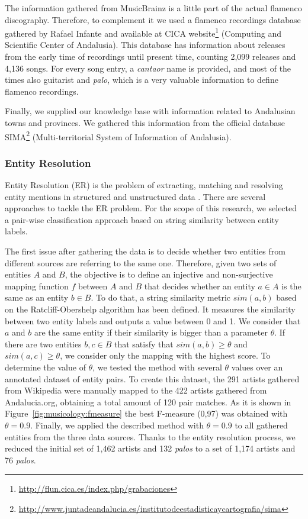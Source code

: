 The information gathered from MusicBrainz is a little part of the actual flamenco discography. Therefore, to complement it we used a flamenco recordings database gathered by Rafael Infante and available at CICA website\footnote{\url{http://flun.cica.es/index.php/grabaciones}} (Computing and Scientific Center of Andalusia). This database has information about releases from the early time of recordings until present time, counting 2,099 releases and 4,136 songs. For every song entry, a \textit{cantaor} name is provided, and most of the times also guitarist and \textit{palo}, which is a very valuable information to define flamenco recordings.

Finally, we supplied our knowledge base with information related to Andalusian towns and provinces. We gathered this information from the official database SIMA\footnote{\url{http://www.juntadeandalucia.es/institutodeestadisticaycartografia/sima}} (Multi-territorial System of Information of Andalusia).%


\subsubsection{Entity Resolution}\label{sec:musicology:entity_resolution}

Entity Resolution (ER) is the problem of extracting, matching and resolving entity mentions in structured and unstructured data \cite{Getoor2012}. There are several approaches to tackle the ER problem. For the scope of this research, we selected a pair-wise classification approach based on string similarity between entity labels.

The first issue after gathering the data is to decide whether two entities from different sources are referring to the same one. Therefore, given two sets of entities $A$ and $B$, the objective is to define an injective and non-surjective mapping function $f$ between $A$ and $B$ that decides whether an entity $a \in A$ is the same as an entity $b \in B$. To do that, a string similarity metric $sim(a,b)$ based on the Ratcliff-Obershelp algorithm \cite{Ratcliff1988} has been defined. It measures the similarity between two entity labels and outputs a value between 0 and 1. We consider that $a$ and $b$ are the same entity if their similarity is bigger than a parameter $\theta$. If there are two entities $b, c \in B$ that satisfy that $sim(a,b) \geq \theta$ and $sim(a,c) \geq \theta$, we consider only the mapping with the highest score. To determine the value of $\theta$, we tested the method with several $\theta$ values over an annotated dataset of entity pairs. To create this dataset, the 291 artists gathered from Wikipedia were manually mapped to the 422 artists gathered from Andalucia.org, obtaining a total amount of 120 pair matches. As it is shown in Figure~\ref{fig:musicology:fmeasure} the best F-measure (0,97) was obtained with $\theta=0.9$. Finally, we applied the described method with $\theta=0.9$ to all gathered entities from the three data sources. Thanks to the entity resolution process, we reduced the initial set of 1,462 artists and 132 \textit{palos} to a set of 1,174 artists and 76 \textit{palos}.

